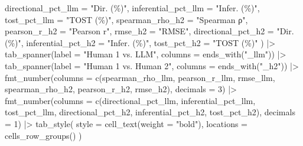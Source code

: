 \documentclass[
  letterpaper,
  DIV=11,
  numbers=noendperiod]{scrartcl}
\newenvironment{Shaded}{\begin{snugshade}}{\end{snugshade}}
\newcommand{\AttributeTok}[1]{\textcolor[rgb]{0.40,0.45,0.13}{#1}}
\newcommand{\DecValTok}[1]{\textcolor[rgb]{0.68,0.00,0.00}{#1}}
\newcommand{\FunctionTok}[1]{\textcolor[rgb]{0.28,0.35,0.67}{#1}}
\newcommand{\NormalTok}[1]{\textcolor[rgb]{0.00,0.23,0.31}{#1}}
\newcommand{\SpecialCharTok}[1]{\textcolor[rgb]{0.37,0.37,0.37}{#1}}
\newcommand{\StringTok}[1]{\textcolor[rgb]{0.13,0.47,0.30}{#1}}
\begin{document}
\begin{Shaded}
\begin{Highlighting}[]
    \AttributeTok{directional\_pct\_llm =} \StringTok{"Dir. (\%)"}\NormalTok{,   }\AttributeTok{inferential\_pct\_llm =} \StringTok{"Infer. (\%)"}\NormalTok{, }\AttributeTok{tost\_pct\_llm =} \StringTok{"TOST (\%)"}\NormalTok{,}
    \AttributeTok{spearman\_rho\_h2     =} \StringTok{"Spearman ρ"}\NormalTok{, }\AttributeTok{pearson\_r\_h2     =} \StringTok{"Pearson r"}\NormalTok{, }\AttributeTok{rmse\_h2     =} \StringTok{"RMSE"}\NormalTok{,}
    \AttributeTok{directional\_pct\_h2  =} \StringTok{"Dir. (\%)"}\NormalTok{,   }\AttributeTok{inferential\_pct\_h2  =} \StringTok{"Infer. (\%)"}\NormalTok{, }\AttributeTok{tost\_pct\_h2  =} \StringTok{"TOST (\%)"}
\NormalTok{  ) }\SpecialCharTok{|\textgreater{}}
  \FunctionTok{tab\_spanner}\NormalTok{(}\AttributeTok{label =} \StringTok{"Human 1 vs. LLM"}\NormalTok{,     }\AttributeTok{columns =} \FunctionTok{ends\_with}\NormalTok{(}\StringTok{"\_llm"}\NormalTok{)) }\SpecialCharTok{|\textgreater{}}
  \FunctionTok{tab\_spanner}\NormalTok{(}\AttributeTok{label =} \StringTok{"Human 1 vs. Human 2"}\NormalTok{, }\AttributeTok{columns =} \FunctionTok{ends\_with}\NormalTok{(}\StringTok{"\_h2"}\NormalTok{)) }\SpecialCharTok{|\textgreater{}}
  \FunctionTok{fmt\_number}\NormalTok{(}\AttributeTok{columns =} \FunctionTok{c}\NormalTok{(spearman\_rho\_llm, pearson\_r\_llm, rmse\_llm,}
\NormalTok{                          spearman\_rho\_h2,  pearson\_r\_h2,  rmse\_h2), }\AttributeTok{decimals =} \DecValTok{3}\NormalTok{) }\SpecialCharTok{|\textgreater{}}
  \FunctionTok{fmt\_number}\NormalTok{(}\AttributeTok{columns =} \FunctionTok{c}\NormalTok{(directional\_pct\_llm, inferential\_pct\_llm, tost\_pct\_llm,}
\NormalTok{                          directional\_pct\_h2,  inferential\_pct\_h2,  tost\_pct\_h2), }\AttributeTok{decimals =} \DecValTok{1}\NormalTok{) }\SpecialCharTok{|\textgreater{}}
  \FunctionTok{tab\_style}\NormalTok{(}
    \AttributeTok{style     =} \FunctionTok{cell\_text}\NormalTok{(}\AttributeTok{weight =} \StringTok{"bold"}\NormalTok{),}
    \AttributeTok{locations =} \FunctionTok{cells\_row\_groups}\NormalTok{()}
\NormalTok{  )}
\end{Highlighting}
\end{Shaded}
\end{document}
